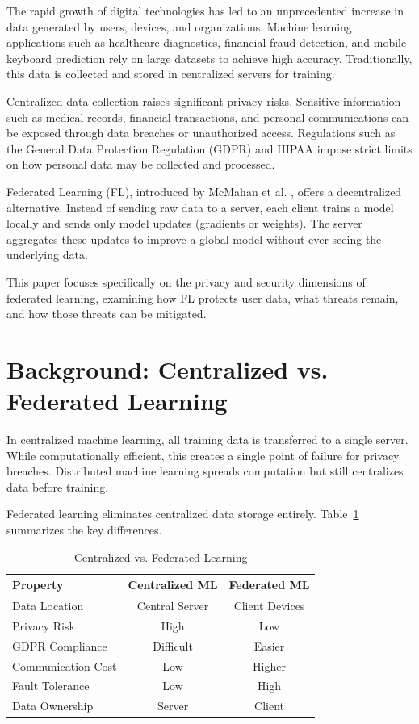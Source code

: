 \documentclass[conference]{IEEEtran}
\begin{document}
The rapid growth of digital technologies has led to an unprecedented increase in data generated by users, devices, and organizations. Machine learning applications such as healthcare diagnostics, financial fraud detection, and mobile keyboard prediction rely on large datasets to achieve high accuracy. Traditionally, this data is collected and stored in centralized servers for training.

Centralized data collection raises significant privacy risks. Sensitive information such as medical records, financial transactions, and personal communications can be exposed through data breaches or unauthorized access. Regulations such as the General Data Protection Regulation (GDPR) \cite{gdpr} and HIPAA impose strict limits on how personal data may be collected and processed.

Federated Learning (FL), introduced by McMahan et al. \cite{mcmahan2017}, offers a decentralized alternative. Instead of sending raw data to a server, each client trains a model locally and sends only model updates (gradients or weights). The server aggregates these updates to improve a global model without ever seeing the underlying data.

This paper focuses specifically on the privacy and security dimensions of federated learning, examining how FL protects user data, what threats remain, and how those threats can be mitigated.

\section{Background: Centralized vs. Federated Learning}

In centralized machine learning, all training data is transferred to a single server. While computationally efficient, this creates a single point of failure for privacy breaches. Distributed machine learning spreads computation but still centralizes data before training.

Federated learning eliminates centralized data storage entirely. Table~\ref{tab:comparison} summarizes the key differences.

\begin{table}[H]
\centering
\caption{Centralized vs. Federated Learning}
\label{tab:comparison}
\renewcommand{\arraystretch}{1.3}
\begin{tabular}{|l|c|c|}
\hline
\textbf{Property} & \textbf{Centralized ML} & \textbf{Federated ML} \\
\hline
Data Location       & Central Server  & Client Devices \\
Privacy Risk        & High            & Low \\
GDPR Compliance     & Difficult       & Easier \\
Communication Cost  & Low             & Higher \\
Fault Tolerance     & Low             & High \\
Data Ownership      & Server          & Client \\
\hline
\end{tabular}
\end{table}
\end{document}
